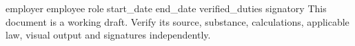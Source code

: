 \documentclass[11pt,a4paper]{article}
\begin{document}
{{employer}}
{{employee}}
{{role}}
{{start_date}}
{{end_date}}
{{verified_duties}}
{{signatory}}
This document is a working draft. Verify its source, substance, calculations, applicable law, visual output and signatures independently.
\end{document}
